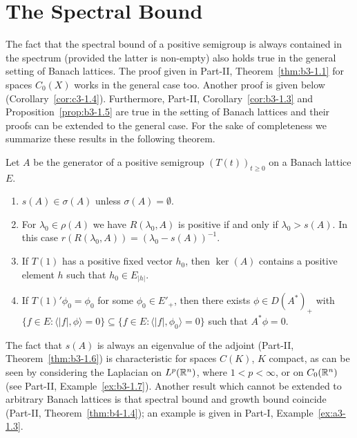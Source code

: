 \section{The Spectral Bound}\label{sec:c3-1}
The fact that the spectral bound of a positive semigroup is always contained in the spectrum (provided the latter  is non-empty) also holds true in the general setting of Banach lattices.
The proof given in Part-II, Theorem~\ref{thm:b3-1.1} for spaces $C_{0}(X)$ works in the general case too.
Another proof is given below (\cf Corollary~\ref{cor:c3-1.4}).
Furthermore, 
Part-II, Corollary~\ref{cor:b3-1.3} and Proposition~\ref{prop:b3-1.5} 
are true in the setting of Banach lattices and their proofs can be extended to the general case.
For the sake of completeness we summarize these results in the following theorem.
\begin{theorem}\label{thm:c3-1.1}
Let $A$ be the generator of a positive semigroup $(T(t))_{t \geq 0}$ on a Banach lattice $E$.
	\begin{enumerate}[\upshape (i)]
		\item 
		$s(A) \in \sigma(A)$ unless $\sigma(A) = \emptyset$.
		
		\item 
		For $\lambda_{0} \in \rho(A)$ we have
		$R(\lambda_{0},A)$ is positive if and only if\/ $\lambda_{0} > s(A)$.
		In this case $r(R(\lambda_{0},A)) = (\lambda_{0} - s(A))^{-1}$.
		
		\item 
		If\/ $T(1)$ has a positive fixed vector $h_{0}$, then $\ker(A)$ contains a positive element $h$ such that $h_{0} \in E_{|h|}$.

		\item 
		If $T(1)'\phi_{0} = \phi_{0}$ for some $\phi_{0} \in E'_{+}$, then there exists $\phi \in D(A^*)_{+}$ with $\{f \in E \colon \langle |f|,\phi\rangle = 0\} \subseteq \{f \in E \colon \langle |f|,\phi_{0}\rangle = 0\}$ such that $A^*\phi = 0$.
	\end{enumerate}
\end{theorem}
The fact that $s(A)$ is always an eigenvalue of the adjoint (\cf Part-II, Theorem~\ref{thm:b3-1.6}) is characteristic for spaces $C(K)$, $K$ compact, as can be seen by considering the Laplacian on $L^p(\mathbb{R}^n)$, where $1 < p < \infty$, or on $C_{0}(\mathbb{R}^n)$ (see Part-II, Example~\ref{ex:b3-1.7}).
Another result which cannot be extended to arbitrary Banach lattices is that spectral bound and growth bound%
coincide (\cf Part-II, Theorem~\ref{thm:b4-1.4}); an example is given in Part-I, Example~\ref{ex:a3-1.3}.
